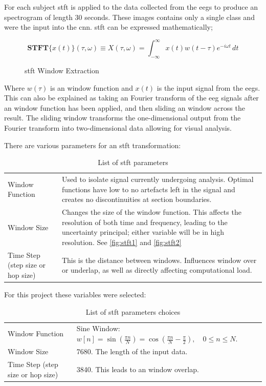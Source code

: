 \documentclass[12pt]{article}
\begin{document}
For each subject \acrshort{stft} is applied to the data collected from the \acrshort{eegs} to produce an spectrogram of length 30 seconds. These images contains only a single class and were the input into the \acrshort{cnn}. \acrshort{stft} can be expressed mathematically;\\ 

\begin{figure}[H]
\[  \mathbf{STFT}\{x(t)\}(\tau,\omega) \equiv X(\tau, \omega) = \int_{-\infty}^{\infty} x(t) w(t-\tau) e^{-i \omega t} \, d t   \]
\caption{\acrfull{stft} Window Extraction}
\label{eq:stft}
\end{figure}

Where $w(\tau)$ is an window function and $x(t)$ is the input signal from the \acrshort{eegs}.\\


This can also be explained as taking an Fourier transform of the \acrshort{eeg} signals after an window function has been applied, and then sliding an window across the result. The sliding window transforms the one-dimensional output from the Fourier transform into two-dimensional data allowing for visual analysis. 


There are various parameters for an \acrshort{stft} transformation: 
\begin{table}[H]
\centering
\begin{tabular}{p{}p{}}
Window Function & Used to isolate signal currently undergoing analysis. Optimal functions have low to no artefacts left in the signal and creates no discontinuities at section boundaries.\\
Window Size & Changes the size of the window function. This affects the resolution of both time and frequency, leading to the uncertainty principal; either variable will be in high resolution. See \ref{fig:stft1} and \ref{fig:stft2} \\
Time Step (step size or hop size) & This is the distance between windows. Influences window over or underlap, as well as directly affecting computational load. \\                            
\end{tabular}
\caption{List of \acrfull{stft} parameters}
\label{tab:stft_params}
\end{table}

For this project these variables were selected:

\begin{table}[H]
\centering
\begin{tabular}{p{}p{}}
Window Function & Sine Window: $ w[n] = \sin\left(\frac{\pi n}{N}\right) = \cos\left(\frac{\pi n}{N} - \frac{\pi}{2}\right),\quad 0\le n \le N.$ \\
Window Size & 7680. The length of the input data. \\
Time Step (step size or hop size) & 3840. This leads to an window overlap. \\                            
\end{tabular}
\caption{List of \acrfull{stft} parameters choices}
\label{tab:stft_choices}
\end{table}
\end{document}
